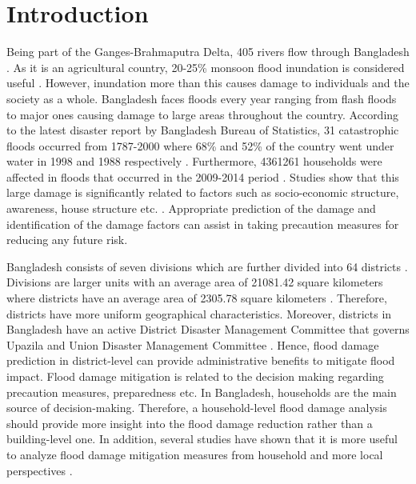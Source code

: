 \documentclass[preprint,review,12pt]{elsarticle}
\begin{document}
\linenumbers
\section{Introduction}
\label{intro}
Being part of the Ganges-Brahmaputra Delta, 405 rivers flow through Bangladesh \cite{anflod}. As it is an agricultural country, 20-25\% monsoon flood inundation is considered useful \cite{anflod}. However, inundation more than this causes damage to individuals and the society as a whole. Bangladesh faces floods every year ranging from flash floods to major ones causing damage to large areas throughout the country. According to the latest disaster report by Bangladesh Bureau of Statistics, 31 catastrophic floods occurred from 1787-2000 where 68\% and 52\% of the country went under water in 1998 and 1988 respectively \cite{disaster}. Furthermore, 4361261 households were affected in floods that occurred in the 2009-2014 period \cite{disaster}. Studies show that this large damage is significantly related to factors such as socio-economic structure, awareness, house structure etc. \cite{merz2013multi,thieken2005flood, zhai2005modeling}. Appropriate prediction of the damage and identification of the damage factors can assist in taking precaution measures for reducing any future risk.  

Bangladesh consists of seven divisions which are further divided into 64 districts \cite{disaster}. Divisions are larger units with an average area of 21081.42 square kilometers where districts have an average area of 2305.78 square kilometers \cite{disstat}. Therefore, districts have more uniform geographical characteristics. Moreover, districts in Bangladesh have an active District Disaster Management Committee that governs Upazila and Union Disaster Management Committee \cite{disasterdist}. Hence, flood damage prediction in district-level can provide administrative benefits to mitigate flood impact. Flood damage mitigation is related to the decision making regarding precaution measures, preparedness etc. In Bangladesh, households are the main source of decision-making. Therefore, a household-level flood damage analysis should provide more insight into the flood damage reduction rather than a building-level one. In addition, several studies have shown that it is more useful to analyze flood damage mitigation measures from household and more local perspectives \cite{kellens2013perception, bubeck2012long, poussin2014factors}.      
\end{document}
